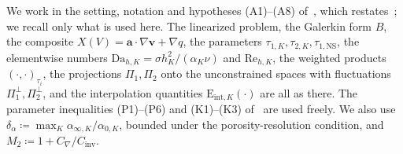 \documentclass[11pt]{article}
\theoremstyle{remark}
\newcommand{\bv}{\boldsymbol{v}}
\newcommand{\ba}{\boldsymbol{a}}
\newcommand{\tns}{\tau_{1,\mathrm{NS}}}
\newcommand{\Eint}[2]{\mathrm{E}_{\mathrm{int},#1}(#2)}
\newcommand{\Dah}{\mathrm{Da}_{h,K}}
\newcommand{\Reh}{\mathrm{Re}_{h,K}}
\newcommand{\Pone}{\Pi_{1}}
\newcommand{\Ptwo}{\Pi_{2}}
\newcommand{\Poneo}{\Pi_{1}^{\perp}}
\newcommand{\Ptwoo}{\Pi_{2}^{\perp}}
\begin{document}
We work in the setting, notation and hypotheses (A1)--(A8) of~\cite{OSGSnote}, which
restates~\cite{companion}; we recall only what is used here. The linearized problem,
the Galerkin form $B$, the composite $X(V) = \ba\cdot\nabla\bv + \nabla q$, the
parameters $\tau_{1,K}, \tau_{2,K}, \tns$, the elementwise numbers
$\Dah = \sigma h_K^2/(\alpha_K\nu)$ and $\Reh$, the weighted products
$(\cdot,\cdot)_{\tau_i}$, the projections $\Pone, \Ptwo$ onto the unconstrained
spaces with fluctuations $\Poneo, \Ptwoo$, and the interpolation quantities
$\Eint{K}{\cdot}$ are all as there. The parameter inequalities (P1)--(P6) and
(K1)--(K3) of~\cite[Lemma~4.1]{OSGSnote} are used freely. We also use
$\delta_\alpha \coloneqq \max_K \alpha_{\infty,K}/\alpha_{0,K}$, bounded under the
porosity-resolution condition, and $M_2 \coloneqq 1 + C_\nabla/C_{\mathrm{inv}}$.
\end{document}
